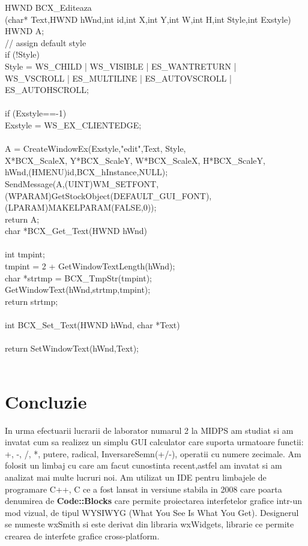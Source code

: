 \documentclass[12pt,a4paper,titlepage]{article}
\begin{document}
HWND BCX_Editeaza\\
(char* Text,HWND hWnd,int id,int X,int Y,int W,int H,int Style,int Exstyle)\\
{
  HWND  A;\\
  // assign default style\\
  if (!Style)\\
  {
      Style = WS_CHILD | WS_VISIBLE | ES_WANTRETURN |\\
              WS_VSCROLL | ES_MULTILINE | ES_AUTOVSCROLL | ES_AUTOHSCROLL;\\
  }\\
  if (Exstyle==-1)\\
  {
      Exstyle = WS_EX_CLIENTEDGE;\\
  }\\
  A = CreateWindowEx(Exstyle,"edit",Text, Style,\\
      X*BCX_ScaleX, Y*BCX_ScaleY, W*BCX_ScaleX, H*BCX_ScaleY,\\
      hWnd,(HMENU)id,BCX_hInstance,NULL);\\

  SendMessage(A,(UINT)WM_SETFONT,(WPARAM)GetStockObject(DEFAULT_GUI_FONT),\\
    (LPARAM)MAKELPARAM(FALSE,0));\\
  return A;\\
}
char *BCX_Get_Text(HWND hWnd)\\
{\\
  int tmpint;\\
  tmpint = 2 + GetWindowTextLength(hWnd);\\
  char *strtmp = BCX_TmpStr(tmpint);\\
  GetWindowText(hWnd,strtmp,tmpint);\\
  return strtmp;\\
}\\
int BCX_Set_Text(HWND hWnd, char *Text)\\
{\\
  return SetWindowText(hWnd,Text);\\
}\\



 
\section{Concluzie}
 \tab  In urma efectuarii lucrarii de laborator numarul 2 la MIDPS am studiat  si am invatat cum sa realizez un simplu GUI calculator care
 suporta urmatoare functii: +, -, /, *, putere, radical, InversareSemn(+/-), operatii cu numere zecimale.
 Am folosit un limbaj cu care am facut cunostinta recent,astfel am invatat si am analizat mai multe lucruri noi.
 Am utilizat  un IDE pentru limbajele de programare C++, C ce a fost lansat in versiune stabila in 2008 care poarta denumirea de
\textbf{Code::Blocks} care permite  proiectarea interfetelor grafice intr-un mod vizual, de tipul WYSIWYG (What You See Is What You Get).
Designerul se numeste wxSmith si este derivat din libraria wxWidgets, librarie ce permite crearea de interfete grafice cross-platform.
      
           
     
\end{document}
